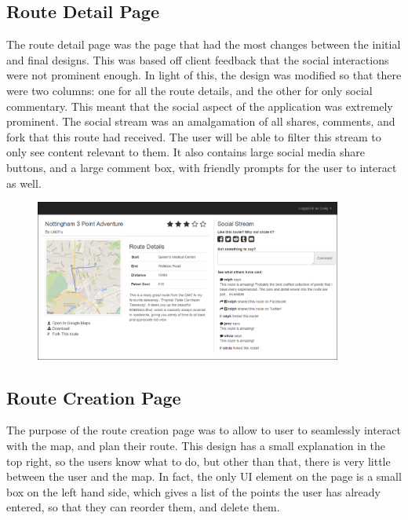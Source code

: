\documentclass[a4paper,twoside,notitlepage,11pt]{article}
\begin{document}
\subsection{Route Detail Page}
The route detail page was the page that had the most changes between the initial and final designs. This was based off client feedback that the social interactions were not prominent enough. In light of this, the design was modified so that there were two columns: one for all the route details, and the other for only social commentary. This meant that the social aspect of the application was extremely prominent. The social stream was an amalgamation of all shares, comments, and fork that this route had received. The user will be able to filter this stream to only see content relevant to them. It also contains large social media share buttons, and a large comment box, with friendly prompts for the user to interact as well.
 \begin{figure}[!ht]
 	\begin{center}
 		\includegraphics[width=0.9\textwidth]{images/final/detailpage.png}
 	\end{center}
 	\vspace{-10mm}
 \end{figure}


\subsection{Route Creation Page}
The purpose of the route creation page was to allow to user to seamlessly interact with the map, and plan their route. This design has a small explanation in the top right, so the users know what to do, but other than that, there is very little between the user and the map. In fact, the only UI element on the page is a small box on the left hand side, which gives a list of the points the user has already entered, so that they can reorder them, and delete them.
\end{document}
